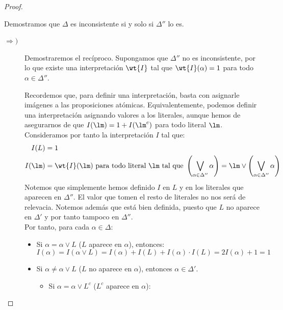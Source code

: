 \begin{teo}
\begin{proof}
\begin{description}
                Demostramos que $\Delta$ es inconsistente si y solo si $\Delta''$ lo es.
                \begin{description}
                    \item[$\Longrightarrow)$] Demostraremos el recíproco. Supongamos que $\Delta''$ no es inconsistente, por lo que existe una interpretación $\wt{I}$ tal que $\wt{I}(\alpha)=1$ para todo $\alpha\in \Delta''$.

                    Recordemos que, para definir una interpretación, basta con asignarle imágenes a las proposiciones atómicas. Equivalentemente, podemos definir una interpretación asignando valores a los literales, aunque hemos de asegurarnos de que $I(\lm)=1+I(\lm^c)$ para todo literal $\lm$.
                    Consideramos por tanto la interpretación $I$ tal que:
                    \begin{align*}
                        I(L)&=1\\
                        I(\lm)&=\wt{I}(\lm)\ \text{para todo literal}\ \lm\ \text{tal que} \ \left(\bigvee_{\alpha\in \Delta''} \alpha\right)=\lm\lor \left(\bigvee_{\alpha\in \Delta''} \alpha\right)
                    \end{align*}
                    Notemos que simplemente hemos definido $I$ en $L$ y en los literales que aparecen en $\Delta''$. El valor que tomen el resto de literales no nos será de relevacia. Notemos además que está bien definida, puesto que $L$ no aparece en $\Delta'$ y por tanto tampoco en $\Delta''$.\\

                    Por tanto, para cada $\alpha\in \Delta$:
                    \begin{itemize}
                        \item Si $\alpha=\alpha\lor L$ ($L$ aparece en $\alpha$), entonces:
                        \begin{equation*}
                            I(\alpha)=I(\alpha\lor L)=I(\alpha)+I(L)+I(\alpha)\cdot I(L)=2I(\alpha)+1=1
                        \end{equation*}

                        \item Si $\alpha\neq \alpha\lor L$ ($L$ no aparece en $\alpha$), entonces $\alpha\in \Delta'$.
                        \begin{itemize}
                            \item Si $\alpha=\alpha\lor L^c$ ($L^c$ aparece en $\alpha$):
                            

\end{itemize}
\end{itemize}
\end{description}
\end{description}
\end{proof}
\end{teo}
